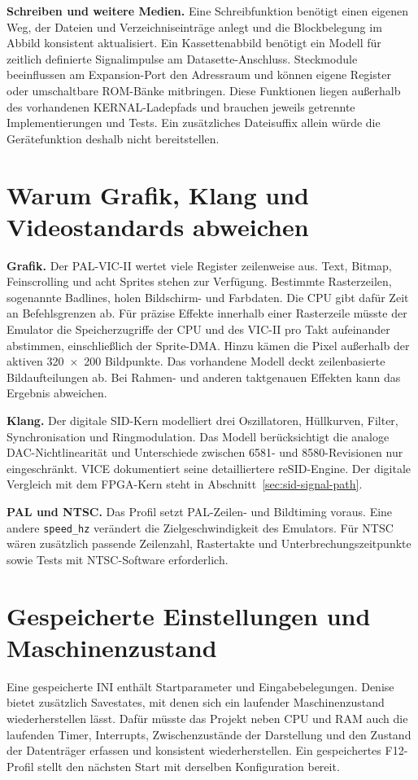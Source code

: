 \documentclass[fontsize=10.2bp,DIV=calc,oneside,open=any,headings=normal,numbers=noenddot]{scrbook}
\begin{document}
\textbf{Schreiben und weitere Medien.} Eine Schreibfunktion benötigt einen
eigenen Weg, der Dateien und Verzeichniseinträge anlegt und die
Blockbelegung im Abbild konsistent aktualisiert. Ein Kassettenabbild
benötigt ein Modell für zeitlich definierte Signalimpulse am
Datasette-Anschluss. Steckmodule beeinflussen am Expansion-Port den
Adressraum und können eigene Register oder umschaltbare ROM-Bänke
mitbringen. Diese Funktionen liegen außerhalb des vorhandenen
KERNAL-Ladepfads und brauchen jeweils getrennte Implementierungen und
Tests. Ein zusätzliches Dateisuffix allein würde die Gerätefunktion
deshalb nicht bereitstellen.

\section{Warum Grafik, Klang und Videostandards abweichen}
\textbf{Grafik.} Der PAL-VIC-II wertet viele Register zeilenweise aus.
Text, Bitmap, Feinscrolling und acht Sprites stehen zur Verfügung.
Bestimmte Rasterzeilen, sogenannte Badlines, holen Bildschirm- und
Farbdaten. Die CPU gibt dafür Zeit an Befehlsgrenzen ab. Für präzise
Effekte innerhalb einer Rasterzeile müsste der Emulator die Speicherzugriffe
der CPU und des VIC-II pro Takt aufeinander abstimmen, einschließlich
der Sprite-DMA. Hinzu kämen die Pixel außerhalb der aktiven
\mbox{320 × 200} Bildpunkte. Das vorhandene Modell deckt zeilenbasierte
Bildaufteilungen ab. Bei Rahmen- und anderen taktgenauen Effekten kann
das Ergebnis abweichen.

\textbf{Klang.} Der digitale SID-Kern modelliert drei Oszillatoren,
Hüllkurven, Filter, Synchronisation und Ringmodulation. Das Modell
berücksichtigt die analoge DAC-Nichtlinearität und Unterschiede zwischen
6581- und 8580-Revisionen nur eingeschränkt. VICE dokumentiert seine
detailliertere reSID-Engine. Der digitale Vergleich mit dem FPGA-Kern
steht in Abschnitt~\ref{sec:sid-signal-path}.

\textbf{PAL und NTSC.} Das Profil setzt PAL-Zeilen- und Bildtiming voraus.
Eine andere \texttt{speed\_hz} verändert die Zielgeschwindigkeit des
Emulators. Für NTSC wären zusätzlich passende Zeilenzahl, Rastertakte
und Unterbrechungszeitpunkte sowie Tests mit NTSC-Software erforderlich.

\clearpage
\section{Gespeicherte Einstellungen und Maschinenzustand}
Eine gespeicherte INI enthält Startparameter und Eingabebelegungen.
Denise bietet zusätzlich Savestates, mit denen sich ein laufender
Maschinenzustand wiederherstellen lässt. Dafür müsste das Projekt neben
CPU und RAM auch die laufenden Timer, Interrupts, Zwischenzustände der
Darstellung und den Zustand der Datenträger erfassen und konsistent
wiederherstellen. Ein gespeichertes F12-Profil stellt den nächsten Start
mit derselben Konfiguration bereit.
\end{document}
